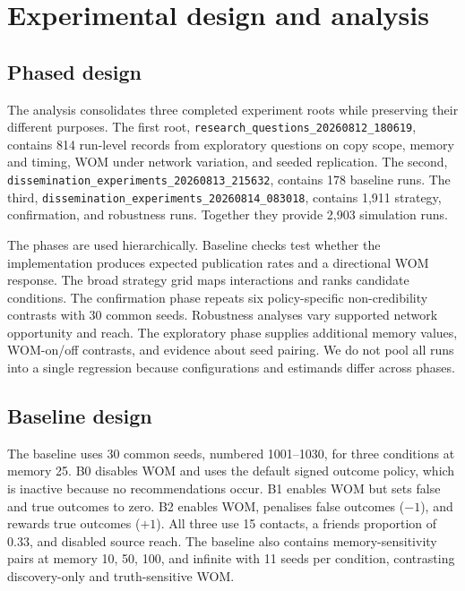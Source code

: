 \section{Experimental design and analysis}
\label{sec:design}

\subsection{Phased design}

The analysis consolidates three completed experiment roots while preserving their different purposes. The first root, \texttt{research\_questions\_20260812\_180619}, contains 814 run-level records from exploratory questions on copy scope, memory and timing, WOM under network variation, and seeded replication. The second, \texttt{dissemination\_experiments\_20260813\_215632}, contains 178 baseline runs. The third, \texttt{dissemination\_experiments\_20260814\_083018}, contains 1,911 strategy, confirmation, and robustness runs. Together they provide 2,903 simulation runs.

The phases are used hierarchically. Baseline checks test whether the implementation produces expected publication rates and a directional WOM response. The broad strategy grid maps interactions and ranks candidate conditions. The confirmation phase repeats six policy-specific non-credibility contrasts with 30 common seeds. Robustness analyses vary supported network opportunity and reach. The exploratory phase supplies additional memory values, WOM-on/off contrasts, and evidence about seed pairing. We do not pool all runs into a single regression because configurations and estimands differ across phases.



\subsection{Baseline design}

The baseline uses 30 common seeds, numbered 1001--1030, for three conditions at memory 25. B0 disables WOM and uses the default signed outcome policy, which is inactive because no recommendations occur. B1 enables WOM but sets false and true outcomes to zero. B2 enables WOM, penalises false outcomes ($-1$), and rewards true outcomes ($+1$). All three use 15 contacts, a friends proportion of 0.33, and disabled source reach. The baseline also contains memory-sensitivity pairs at memory 10, 50, 100, and infinite with 11 seeds per condition, contrasting discovery-only and truth-sensitive WOM.

